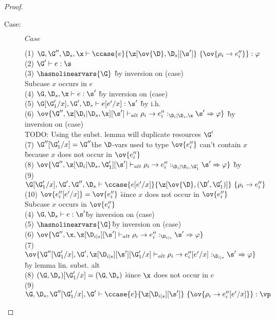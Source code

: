 \begin{proof}
\begin{description}
\item[Case:] $Case$
\begin{tabbing}
    (1) $\G, \G'', \D_s, \x \vdash \ccase{e}{\z[\ov{\D},\D_s][\s']}~\{\ov{\rho_i
    \to e''_i}\} : \varphi$\\
    (2) $\G' \vdash e : \s$\\
    (3) $\hasnolinearvars{\G}$ \` by inversion on (case)\\
    Subcase $x$ occurs in $e$\\
    (4) $\G, \D_s, \x \vdash e : \s'$ \` by inversion on (case)\\
    (5) $\G[\G'_1/x],\G',\D_s \vdash e[e'/x] : \s'$ \` by i.h.\\
    (6) $\ov{\G'',\z[\D_i|\D_s,\x][\s'] \vdash_{alt} \rho_i \to e''_i :_{\D_i|\D_s,\x} \s' \Rightarrow \varphi}$ \` by inversion on (case)\\
    TODO: Using the subst. lemma will duplicate resources $\G'$\\
    (7) $\G''[\G'_1/x]=\G''$\` the $\D$-vars used to type $\ov{e''_i}$ can't contain $x$\\
                            \` because $x$ does not occur in $\ov{e''_i}$\\
    (8) $\ov{\G'',\z[\D_i|\D_s,\G'_1][\s'] \vdash_{alt} \rho_i \to e''_i :_{\D_i|\D_s,\G'_1} \s' \Rightarrow \varphi}$ \` by \\
    (9) $\G[\G'_1/x],\G',\G'',\D_s \vdash \ccase{e[e'/x]}{\z[\ov{\D},(\D',\G'_1)]}~\{\rho_i \to e''_i\}$\\
    (10) $\ov{e''_i[e'/x]} = \ov{e''_i}$ \` since $x$ does not occur in $\ov{e''_i}$\\
    Subcase $x$ occurs in $\ov{e''_i}$\\
    (4) $\G,\D_s \vdash e : \s'$\` by inversion on (case)\\
    (5) $\hasnolinearvars{\G}$\` by inversion on (case)\\
    (6) $\ov{\G'',\x,\z[\D_{i|s}][\s'] \vdash_{alt} \rho_i \to e''_i :_{\D_{i|s}} \s' \Rightarrow \varphi}$\\
    (7) $\ov{\G''[\G'_1/x],\G',\z[\D_{i|s}][\s'][\G'_1/x] \vdash_{alt} \rho_i \to e''_i[e'/x] :_{\D_{i|s}} \s' \Rightarrow \varphi}$\\\` by lemma lin. subst. alt\\
    (8) $(\G,\D_s)[\G'_1/x] = (\G,\D_s)$ \` since $\x$ does not occur in $e$\\
    (9) $\G,\D_s,\G''[\G'_1/x],\G' \vdash \ccase{e}{\z[\D_{i|s}][\s']}~\{\ov{\rho_i \to e''_i[e'/x]}\} : \vp$\\
\end{tabbing}
\end{description}
\end{proof}

